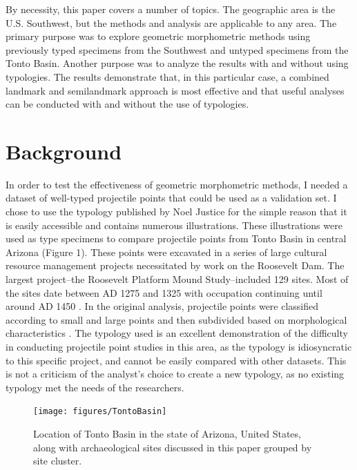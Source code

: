 \documentclass[a4paper]{article}
\begin{document}
By necessity, this paper covers a number of topics. The geographic area is the U.S. Southwest, but the methods and analysis are applicable to any area. The primary purpose was to explore geometric morphometric methods using previously typed specimens from the Southwest and untyped specimens from the Tonto Basin. Another purpose was to analyze the results with and without using typologies. The results demonstrate that, in this particular case, a combined landmark and semilandmark approach is most effective and that useful analyses can be conducted with and without the use of typologies.

\hypertarget{background}{%
\section*{Background}\label{background}}

In order to test the effectiveness of geometric morphometric methods, I needed a dataset of well-typed projectile points that could be used as a validation set. I chose to use the typology published by Noel Justice \autocite*{Justice2002-cf} for the simple reason that it is easily accessible and contains numerous illustrations. These illustrations were used as type specimens to compare projectile points from Tonto Basin in central Arizona (Figure 1). These points were excavated in a series of large cultural resource management projects necessitated by work on the Roosevelt Dam. The largest project--the Roosevelt Platform Mound Study--included 129 sites. Most of the sites date between AD 1275 and 1325 with occupation continuing until around AD 1450 \autocite{Rice1998-ku}. In the original analysis, projectile points were classified according to small and large points and then subdivided based on morphological characteristics \autocite[p.727]{Rice1994-rk}. The typology used is an excellent demonstration of the difficulty in conducting projectile point studies in this area, as the typology is idiosyncratic to this specific project, and cannot be easily compared with other datasets. This is not a criticism of the analyst's choice to create a new typology, as no existing typology met the needs of the researchers.

\begin{figure}
\texttt{[image: figures/TontoBasin]} \caption{Location of Tonto Basin in the state of Arizona, United States, along with archaeological sites discussed in this paper grouped by site cluster.}\label{fig:TontoBasinMap}
\end{figure}
\end{document}
